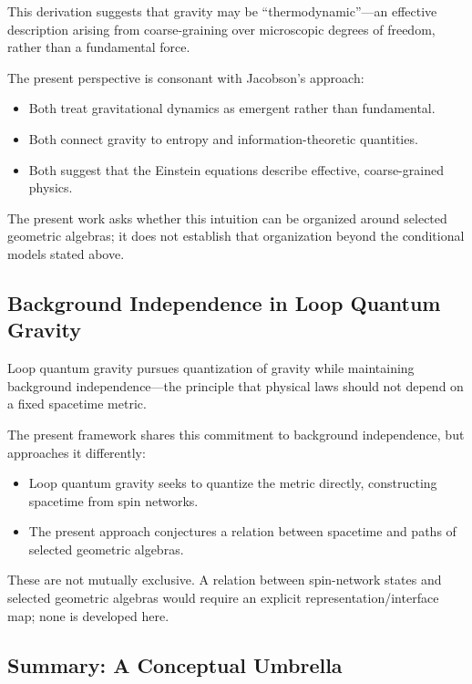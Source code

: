\documentclass[12pt,a4paper,openany]{book}
\begin{document}
This derivation suggests that gravity may be ``thermodynamic''—an effective description arising from coarse-graining over microscopic degrees of freedom, rather than a fundamental force.

The present perspective is consonant with Jacobson's approach:
\begin{itemize}
    \item Both treat gravitational dynamics as emergent rather than fundamental.
    \item Both connect gravity to entropy and information-theoretic quantities.
    \item Both suggest that the Einstein equations describe effective, coarse-grained physics.
\end{itemize}

The present work asks whether this intuition can be organized around selected geometric algebras; it does not establish that organization beyond the conditional models stated above.

\subsection{Background Independence in Loop Quantum Gravity}

Loop quantum gravity \cite{Rovelli2004,Thiemann2007} pursues quantization of gravity while maintaining background independence—the principle that physical laws should not depend on a fixed spacetime metric.

The present framework shares this commitment to background independence, but approaches it differently:
\begin{itemize}
    \item Loop quantum gravity seeks to quantize the metric directly, constructing spacetime from spin networks.
    \item The present approach conjectures a relation between spacetime and paths of selected geometric algebras.
\end{itemize}

These are not mutually exclusive.  A relation between spin-network states and selected geometric algebras would require an explicit representation/interface map; none is developed here.

\subsection{Summary: A Conceptual Umbrella}
\end{document}
